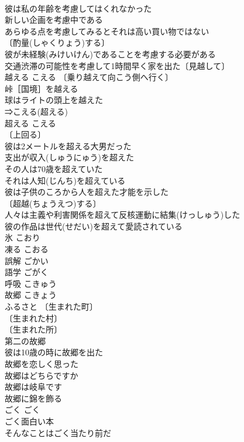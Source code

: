 \documentclass[8pt]{extreport}
\begin{document}
\begin{CJK}{UTF8}{min}
\\	彼は私の年齢を考慮してはくれなかった 
\\	新しい企画を考慮中である 
\\	あらゆる点を考慮してみるとそれは高い買い物ではない 
\\	〔酌量(しゃくりょう)する〕　
\\	彼が未経験(みけいけん)であることを考慮する必要がある 
\\	交通渋滞の可能性を考慮して1時間早く家を出た〔見越して〕 
\\	越える	こえる	〔乗り越えて向こう側へ行く〕
\\	峠［国境］を越える 
\\	球はライトの頭上を越えた 
\\	⇒こえる(超える)
\\	超える	こえる	
\\	〔上回る〕
\\	彼は2メートルを超える大男だった 
\\	支出が収入(しゅうにゅう)を超えた 
\\	その人は70歳を超えていた 
\\	それは人知(じんち)を超えている 
\\	彼は子供のころから人を超えた才能を示した 
\\	〔超越(ちょうえつ)する〕
\\	人々は主義や利害関係を超えて反核運動に結集(けっしゅう)した 
\\	彼の作品は世代(せだい)を超えて愛読されている 
\\	氷	こおり	
\\	凍る	こおる	
\\	誤解	ごかい	
\\	語学	ごがく	
\\	呼吸	こきゅう	
\\	故郷	こきょう 
\\	ふるさと	〔生まれた町〕
\\	〔生まれた村〕
\\	〔生まれた所〕
\\	第二の故郷 
\\	彼は10歳の時に故郷を出た 
\\	故郷を恋しく思った 
\\	故郷はどちらですか 
\\	故郷は岐阜です 
\\	故郷に錦を飾る 
\\	ごく	ごく	
\\	ごく面白い本 
\\	そんなことはごく当たり前だ 

\end{CJK}
\end{document}

